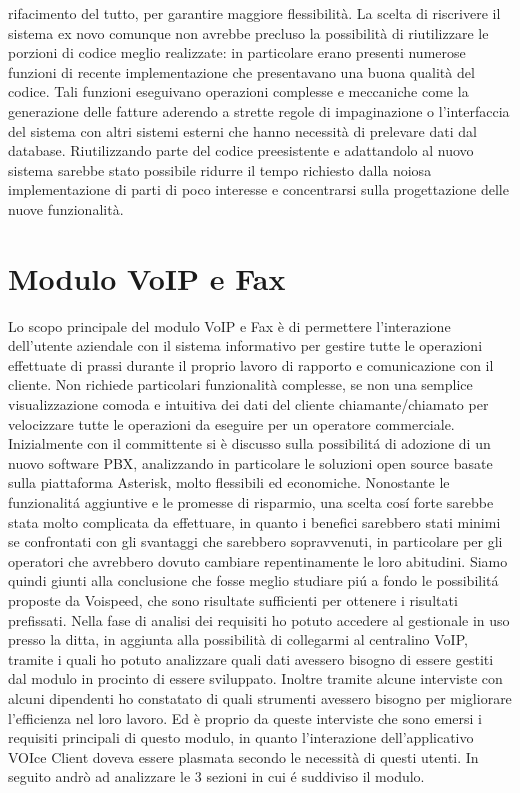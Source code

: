 rifacimento del tutto, per garantire maggiore flessibilit\`a. La scelta di riscrivere il sistema ex novo comunque non 
avrebbe precluso la possibilit\`a di riutilizzare le porzioni di codice meglio realizzate: in particolare erano presenti
 numerose funzioni di recente implementazione che presentavano una buona qualit\`a del codice. 
Tali funzioni eseguivano operazioni complesse e meccaniche come la generazione delle fatture aderendo a strette regole di 
impaginazione o l'interfaccia del sistema con altri sistemi esterni che hanno necessit\`a di prelevare dati dal database. 
Riutilizzando parte del codice preesistente e adattandolo al nuovo sistema sarebbe stato possibile  
ridurre il tempo richiesto dalla noiosa implementazione di parti di poco interesse  e concentrarsi sulla 
progettazione delle nuove funzionalit\`a.

\section{Modulo VoIP e Fax}
Lo scopo principale del modulo VoIP e Fax \`e di permettere l'interazione dell'utente aziendale con il sistema
informativo per gestire tutte le operazioni effettuate di prassi durante il proprio lavoro di rapporto e comunicazione 
con il cliente. Non richiede particolari funzionalit\`a complesse, se non una semplice visualizzazione comoda e intuitiva 
dei dati del cliente chiamante/chiamato per velocizzare tutte le operazioni da eseguire per un operatore commerciale.
Inizialmente con il committente si \`e discusso sulla possibilit\'a di adozione di un nuovo software PBX, analizzando in 
particolare le soluzioni open source basate sulla piattaforma Asterisk, molto flessibili ed economiche. Nonostante le 
funzionalit\'a aggiuntive e le promesse di risparmio, una scelta cos\'i forte sarebbe stata molto complicata da effettuare, 
in quanto i benefici sarebbero stati minimi se confrontati con gli svantaggi che sarebbero sopravvenuti, in particolare per 
gli operatori che avrebbero dovuto cambiare repentinamente le loro abitudini. Siamo quindi giunti alla conclusione che fosse 
meglio studiare pi\'u a fondo le possibilit\'a proposte da Voispeed, che sono risultate sufficienti per ottenere i risultati 
prefissati.
Nella fase di analisi dei requisiti ho potuto accedere al gestionale in uso presso la ditta, in aggiunta alla possibilit\`a di 
collegarmi al centralino VoIP, tramite i quali ho potuto analizzare quali dati avessero bisogno di essere gestiti dal modulo
in procinto di essere sviluppato. Inoltre tramite alcune interviste con alcuni dipendenti ho constatato di quali strumenti
avessero bisogno per migliorare l'efficienza nel loro lavoro. Ed \`e proprio da queste interviste che sono emersi i requisiti
principali di questo modulo, in quanto l'interazione dell'applicativo VOIce Client doveva essere plasmata secondo le 
necessit\`a di questi utenti. In seguito andr\`o ad analizzare le 3 sezioni in cui \'e suddiviso il modulo.
\newpage
